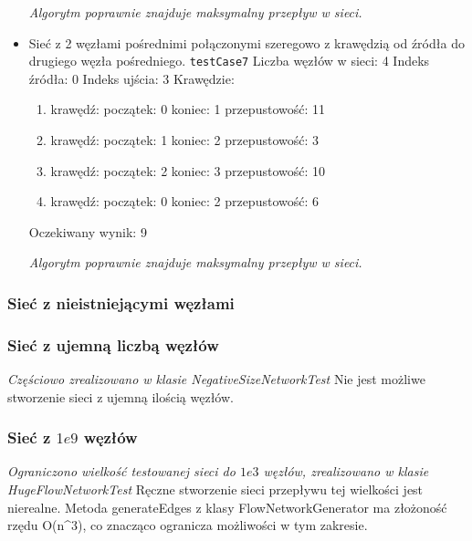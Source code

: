 \begin{itemize}[nosep]
    \emph{Algorytm
    poprawnie znajduje maksymalny przepływ w sieci.}

    \item Sieć z 2 węzłami pośrednimi połączonymi szeregowo z krawędzią od
    źródła do drugiego węzła pośredniego.
    \texttt{testCase7}
    Liczba węzłów w sieci: 4
    Indeks źródła: 0
    Indeks ujścia: 3
    Krawędzie:
    \begin{enumerate}[nosep]
        \item krawędź:
        początek: 0
        koniec: 1
        przepustowość: 11
        \item krawędź:
        początek: 1
        koniec: 2
        przepustowość: 3
        \item krawędź:
        początek: 2
        koniec: 3
        przepustowość: 10
        \item krawędź:
        początek: 0
        koniec: 2
        przepustowość: 6
    \end{enumerate}
    Oczekiwany wynik: 9

    \emph{Algorytm
    poprawnie znajduje maksymalny przepływ w sieci.}

\end{itemize}


\subsubsection{Sieć z nieistniejącymi węzłami}


\subsubsection{Sieć z ujemną liczbą węzłów}
\emph{Częściowo zrealizowano w klasie NegativeSizeNetworkTest}
Nie jest możliwe stworzenie sieci z ujemną ilością węzłów.

\subsubsection{Sieć z $1e9$ węzłów}
\emph{Ograniczono wielkość testowanej sieci do $1e3$ węzłów, zrealizowano w klasie HugeFlowNetworkTest}
Ręczne stworzenie sieci przepływu tej wielkości jest nierealne.
Metoda generateEdges z klasy FlowNetworkGenerator ma złożoność rzędu O(n^3),
co znacząco ogranicza możliwości w tym zakresie.

